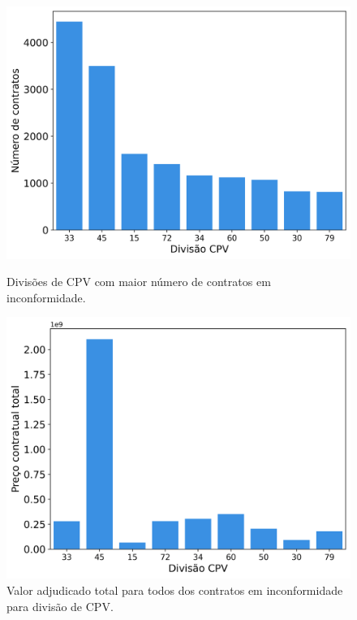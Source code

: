 \begin{figure}[H]
	\centering
	\begin{minipage}{.48\linewidth}
		\includegraphics[width=\linewidth]{imagens/r018/main_cpvs.png}
		\caption{Divisões de CPV com maior número de contratos em inconformidade.}
	\end{minipage}
	\hfill
	\begin{minipage}{.49\linewidth}
		\includegraphics[width=\linewidth]{imagens/r018/prices.png}
		\caption{Valor adjudicado total para todos dos contratos em inconformidade para divisão de CPV.}
	\end{minipage}
\end{figure}




